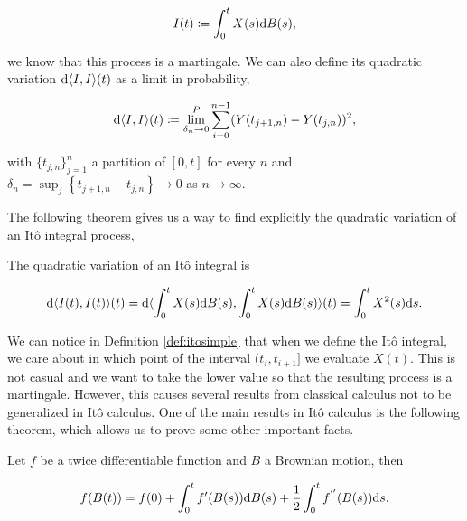     \begin{equation*}
        I(t) \coloneqq \int_0^t X(s) \mathrm d B(s),
    \end{equation*}

\noindent we know that this process is a martingale. We can also define its quadratic variation $\mathrm d \langle I,I \rangle(t)$ as a limit in probability,

    \begin{equation*}
        \mathrm d \langle I,I \rangle(t) \coloneqq \lim^P_{\delta_n \to 0} \sum_{i=0}^{n-1} ( Y(t_{j+1,n}) - Y(t_{j,n}) )^2,
    \end{equation*}

    \noindent with $\{t_{j,n}\}_{j=1}^n$ a partition of $[0,t]$ for every $n$ and $\delta_n = \sup_j \left\{ t_{j+1,n} - t_{j,n} \right\} \to 0$ as $n\to \infty$.
    
    The following theorem gives us a way to find explicitly the quadratic variation of an Itô integral process,

\begin{theorem}
    The quadratic variation of an Itô integral is

    \begin{equation*}
        \mathrm d \langle I(t),I(t)\rangle(t) = \mathrm d \langle \int_0^t X(s) \mathrm d B(s), \int_0^t X(s) \mathrm d B(s) \rangle(t) = \int_0^t X^2(s) \mathrm d s.
    \end{equation*}
\end{theorem}

We can notice in Definition \ref{def:itosimple} that when we define the Itô integral, we care about in which point of the interval $(t_{i},t_{i+1}]$ we evaluate $X(t)$. This is not casual and we want to take the lower value so that the resulting process is a martingale. However, this causes several results from classical calculus not to be generalized in Itô calculus. One of the main results in Itô calculus is the following theorem, which allows us to prove some other important facts.

\begin{theorem} \label{thm:ito_formula_brownian}
    Let $f$ be a twice differentiable function and $B$ a Brownian motion, then

    \begin{equation*}
        f(B(t)) = f(0) + \int_0^t f'(B(s)) \mathrm d B(s) + \frac12 \int_0^t f^{''}(B(s)) \mathrm d s.
    \end{equation*}
\end{theorem}

